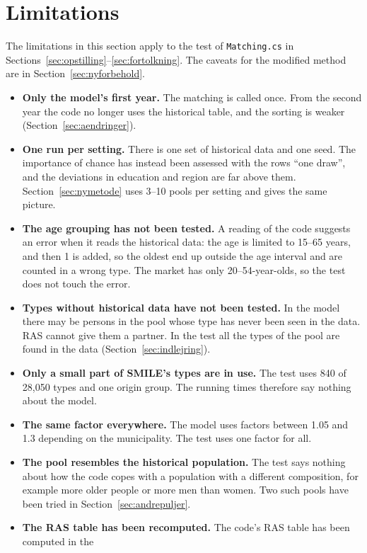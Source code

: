 \documentclass[12pt,a4paper]{article}
\newcommand{\kode}[1]{\texttt{#1}}
\begin{document}
\section{Limitations}\label{sec:forbehold}

The limitations in this section apply to the test of \kode{Matching.cs} in
Sections~\ref{sec:opstilling}--\ref{sec:fortolkning}. The caveats for the modified method are in
Section~\ref{sec:nyforbehold}.

\begin{itemize}
\item \textbf{Only the model's first year.} The matching is called once. From the second year the
code no longer uses the historical table, and the sorting is weaker (Section~\ref{sec:aendringer}).
\item \textbf{One run per setting.} There is one set of historical data and one seed. The
importance of chance has instead been assessed with the rows ``one draw'', and the deviations in
education and region are far above them. Section~\ref{sec:nymetode} uses 3--10 pools per setting
and gives the same picture.
\item \textbf{The age grouping has not been tested.} A reading of the code suggests an error when
it reads the historical data: the age is limited to 15--65 years, and then 1 is added, so the
oldest end up outside the age interval and are counted in a wrong type. The market has only
20--54-year-olds, so the test does not touch the error.
\item \textbf{Types without historical data have not been tested.} In the model there may be
persons in the pool whose type has never been seen in the data. RAS cannot give them a partner. In
the test all the types of the pool are found in the data (Section~\ref{sec:indlejring}).
\item \textbf{Only a small part of SMILE's types are in use.} The test uses 840 of 28,050 types and
one origin group. The running times therefore say nothing about the model.
\item \textbf{The same factor everywhere.} The model uses factors between 1.05 and 1.3 depending on
the municipality. The test uses one factor for all.
\item \textbf{The pool resembles the historical population.} The test says nothing about how the
code copes with a population with a different composition, for example more older people or more
men than women. Two such pools have been tried in Section~\ref{sec:andrepuljer}.
\item \textbf{The RAS table has been recomputed.} The code's RAS table has been computed in the

\end{itemize}
\end{document}
